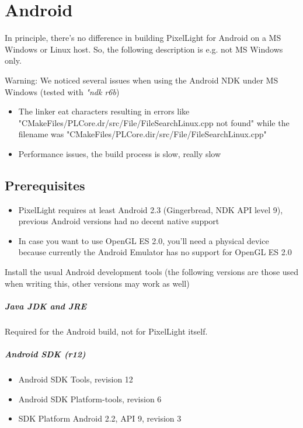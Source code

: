 \chapter{Android}
In principle, there's no difference in building PixelLight for Android on a MS Windows or Linux host. So, the following description is e.g. not MS Windows only.

Warning: We noticed several issues when using the Android NDK under MS Windows (tested with \emph{"ndk r6b})
\begin{itemize}
\item{The linker eat characters resulting in errors like "CMakeFiles/PLCore.dr/src/File/FileSearchLinux.cpp not found" while the filename was "CMakeFiles/PLCore.dir/src/File/FileSearchLinux.cpp"}
\item{Performance issues, the build process is slow, really slow}
\end{itemize}




\section{Prerequisites}
\begin{itemize}
\item{PixelLight requires at least Android 2.3 (Gingerbread, NDK API level 9), previous Android versions had no decent native support}
\item{In case you want to use OpenGL ES 2.0, you'll need a physical device because currently the Android Emulator has no support for OpenGL ES 2.0}
\end{itemize}

Install the usual Android development tools (the following versions are those used when writing this, other versions may work as well)


\paragraph{Java JDK and JRE}
Required for the Android build, not for PixelLight itself.


\paragraph{Android SDK (\emph{r12})}
\begin{itemize}
\item{Android SDK Tools, revision 12}
\item{Android SDK Platform-tools, revision 6}
\item{SDK Platform Android 2.2, API 9, revision 3}
\end{itemize}


